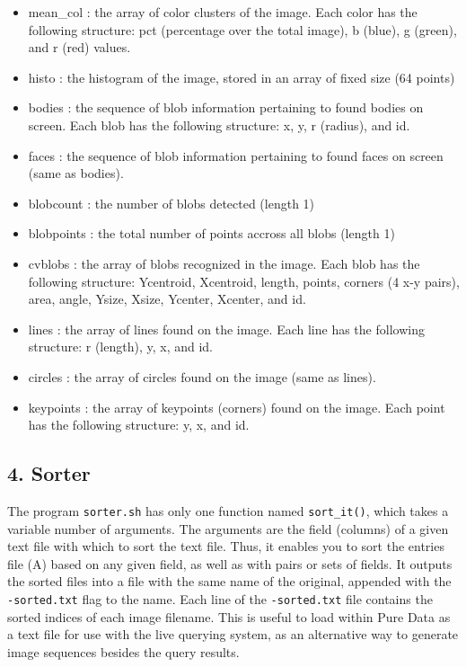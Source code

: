 \begin{itemize}
\singlespacing
\item mean\_col : the array of color clusters of the image. Each color has the following structure: pct (percentage over the total image), b (blue), g (green), and r (red) values.
\item histo : the histogram of the image, stored in an array of fixed size (64 points)
\item bodies : the sequence of blob information pertaining to found bodies on screen. Each blob has the following structure: x, y, r (radius), and id.
\item faces : the sequence of blob information pertaining to found faces on screen (same as bodies).
\item blobcount : the number of blobs detected (length 1)
\item blobpoints :  the total number of points accross all blobs (length 1)
\item cvblobs : the array of blobs recognized in the image. Each blob has the following structure: Ycentroid, Xcentroid, length, points, corners (4 x-y pairs), area, angle, Ysize, Xsize, Ycenter, Xcenter, and id. 
\item lines : the array of lines found on the image. Each line has the following structure: r (length), y, x, and id. 
\item circles : the array of circles found on the image (same as lines).
\item keypoints : the array of keypoints (corners) found on the image. Each point has the following structure: y, x, and id.
\end{itemize}


\subsection*{4. Sorter}

The program \texttt{sorter.sh} has only one function named \texttt{sort\_it()}, which takes a variable number of arguments. The arguments are the field (columns) of a given text file with which to sort the text file. Thus, it enables you to sort the entries file (A) based on any given field, as well as with pairs or sets of fields. It outputs the sorted files into a file with the same name of the original, appended with the \texttt{-sorted.txt} flag to the name. Each line of the \texttt{-sorted.txt} file contains the sorted indices of each image filename. This is useful to load within Pure Data as a text file for use with the live querying system, as an alternative way to generate image sequences besides the query results.



